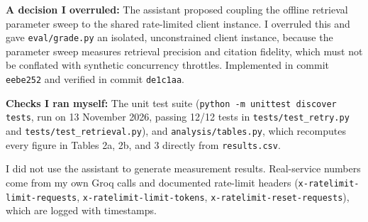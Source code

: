 \documentclass[10pt,a4paper]{article}
\begin{document}
\textbf{A decision I overruled:} The assistant proposed coupling the offline retrieval parameter sweep to the shared rate-limited client instance. I overruled this and gave \texttt{eval/grade.py} an isolated, unconstrained client instance, because the parameter sweep measures retrieval precision and citation fidelity, which must not be conflated with synthetic concurrency throttles. Implemented in commit \texttt{eebe252} and verified in commit \texttt{de1c1aa}.

\textbf{Checks I ran myself:} The unit test suite (\texttt{python -m unittest discover tests}, run on 13 November 2026, passing 12/12 tests in \texttt{tests/test\_retry.py} and \texttt{tests/test\_retrieval.py}), and \texttt{analysis/tables.py}, which recomputes every figure in Tables 2a, 2b, and 3 directly from \texttt{results.csv}.

I did not use the assistant to generate measurement results. Real-service numbers come from my own Groq calls and documented rate-limit headers (\texttt{x-ratelimit-limit-requests}, \texttt{x-ratelimit-limit-tokens}, \texttt{x-ratelimit-reset-requests}), which are logged with timestamps.
\end{document}
